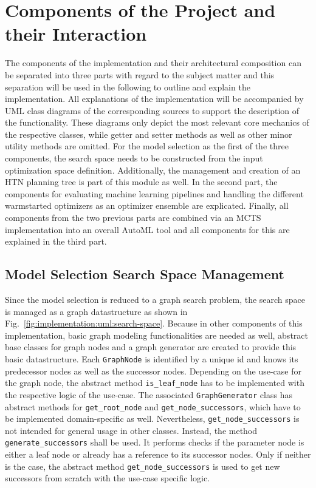 \section{Components of the Project and their Interaction}
\label{sec:implementation:components}
The components of the implementation and their architectural composition can be separated into three parts with regard to the subject matter and this separation will be used in the following to outline and explain the implementation.
All explanations of the implementation will be accompanied by UML class diagrams of the corresponding sources to support the description of the functionality.
These diagrams only depict the most relevant core mechanics of the respective classes, while getter and setter methods as well as other minor utility methods are omitted.\newline 
For the model selection as the first of the three components, the search space needs to be constructed from the input optimization space definition.
Additionally, the management and creation of an HTN planning tree is part of this module as well.\newline
In the second part, the components for evaluating machine learning pipelines and handling the different warmstarted optimizers as an optimizer ensemble are explicated.\newline
Finally, all components from the two previous parts are combined via an MCTS implementation into an overall AutoML tool and all components for this are explained in the third part.

\subsection{Model Selection Search Space Management}
\label{sec:implementation:components:search-space}
Since the model selection is reduced to a graph search problem, the search space is managed as a graph datastructure as shown in Fig.~\ref{fig:implementation:uml:search-space}.
Because in other components of this implementation, basic graph modeling functionalities are needed as well, abstract base classes for graph nodes and a graph generator are created to provide this basic datastructure.\newline
Each \texttt{GraphNode} is identified by a unique id and knows its predecessor nodes as well as the successor nodes.
Depending on the use-case for the graph node, the abstract method \texttt{is\_leaf\_node} has to be implemented with the respective logic of the use-case.\newline
The associated \texttt{GraphGenerator} class has abstract methods for \texttt{get\_root\_node} and \texttt{get\_node\_successors}, which have to be implemented domain-specific as well.
Nevertheless, \texttt{get\_node\_successors} is not intended for general usage in other classes.
Instead, the method \texttt{generate\_successors} shall be used.
It performs checks if the parameter node is either a leaf node or already has a reference to its successor nodes.
Only if neither is the case, the abstract method \texttt{get\_node\_successors} is used to get new successors from scratch with the use-case specific logic.

